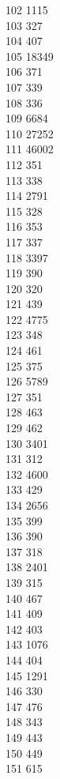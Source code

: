 { 102	1115 \\
 103	327 \\
 104	407 \\
 105	18349 \\
 106	371 \\
 107	339 \\
 108	336 \\
 109	6684 \\
 110	27252 \\
 111	46002 \\
 112	351 \\
 113	338 \\
 114	2791 \\
 115	328 \\
 116	353 \\
 117	337 \\
 118	3397 \\
 119	390 \\
 120	320 \\
 121	439 \\
 122	4775 \\
 123	348 \\
 124	461 \\
 125	375 \\
 126	5789 \\
 127	351 \\
 128	463 \\
 129	462 \\
 130	3401 \\
 131	312 \\
 132	4600 \\
 133	429 \\
 134	2656 \\
 135	399 \\
 136	390 \\
 137	318 \\
 138	2401 \\
 139	315 \\
 140	467 \\
 141	409 \\
 142	403 \\
 143	1076 \\
 144	404 \\
 145	1291 \\
 146	330 \\
 147	476 \\
 148	343 \\
 149	443 \\
 150	449 \\
 151	615 \\
}
